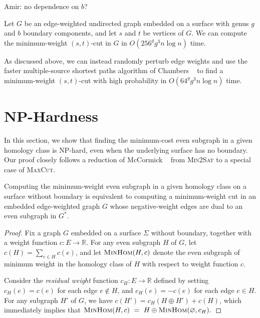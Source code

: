 \documentclass[letterpaper,review]{siamart190516}
\def\Real{\mathbb{R}}
\def\anote#1{\color{purple}Amir: #1 \color{black}}
\begin{document}
{\anote{no dependence on $b$?}
\begin{corollary}
\label{cor:mincut}
Let $G$ be an edge-weighted undirected graph embedded on a surface with genus $g$ and $b$ boundary
components, and let $s$ and $t$ be vertices of $G$.  We can compute the minimum-weight $(s,t)$-cut
in $G$ in $O(256^g g^3 n \log n)$ time.
\end{corollary}

As discussed above, we can instead randomly perturb edge weights and use the faster multiple-source
shortest paths algorithm of Chambers \etal~\cite{cce-msspe-13} to find a minimum-weight $(s,t)$-cut
with high probability in $O(64^g g^3 n \log n)$ time.

\section{{NP}-Hardness}
\label{S:NPhard}

In this section, we show that finding the minimum-cost even subgraph in a given homology class is {NP}-hard, even when the underlying surface has no boundary.  Our proof closely follows a reduction of McCormick \etal~\cite{mrr-edofm-03} from \textsc{Min2Sat} to a special case of \textsc{MaxCut}.

\begin{theorem}
Computing the minimum-weight even subgraph in a given homology class on a surface without boundary is equivalent to computing a minimum-weight cut in an embedded edge-weighted graph $G$ whose negative-weight edges are dual to an even subgraph in $G^*$.
\end{theorem}

\begin{proof}
Fix a graph $G$ embedded on a surface $\Sigma$ without boundary, together with a weight function $c\colon E\to \Real$.  For any even subgraph $H$ of $G$, let $c(H) = \sum_{e\in H} c(e)$, and let $\textsc{MinHom}(H,c)$ denote the even subgraph of minimum weight in the homology class of $H$ with respect to weight function $c$.

Consider the \emph{residual weight} function $c_H\colon E\to \Real$ defined by setting $c_H(e) = c(e)$ for each edge $e\not\in H$, and $c_H(e) = -c(e)$ for each edge $e\in H$.  For any subgraph $H'$ of $G$, we have $c(H') = c_H(H\oplus H') + c(H)$, which immediately implies that
\(
    \textsc{MinHom}(H,c) ~=~
    H \oplus \textsc{MinHom}(\varnothing, c_H).
\)


\end{proof}}
\end{document}
